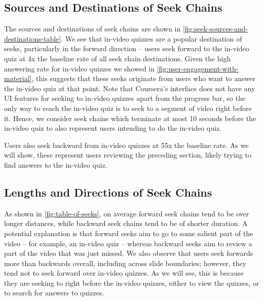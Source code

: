 \documentclass{sigchi}
\begin{document}
\subsection{Sources and Destinations of Seek Chains}

The sources and destinations of seek chains are shown in \autoref{fig:seek-sources-and-destinations-table}. We see that in-video quizzes are a popular destination of seeks, particularly in the forward direction -- users seek forward to the in-video quiz at 4x the baseline rate of all seek chain destinations. Given the high answering rate for in-video quizzes we showed in \autoref{fig:user-engagement-with-material}, this suggests that these seeks originate from users who want to answer the in-video quiz at that point. Note that Coursera's interface does not have any UI features for seeking to in-video quizzes apart from the progress bar, so the only way to reach the in-video quiz is to seek to a segment of video right before it. Hence, we consider seek chains which terminate at most 10 seconds before the in-video quiz to also represent users intending to do the in-video quiz.

Users also seek backward from in-video quizzes at 55x the baseline rate. As we will show, these represent users reviewing the preceding section, likely trying to find answers to the in-video quiz.





\subsection{Lengths and Directions of Seek Chains}

As shown in \autoref{fig:table-of-seeks}, on average forward seek chains tend to be over longer distances, while backward seek chains tend to be of shorter duration. A potential explanation is that forward seeks aim to go to some salient part of the video -- for example, an in-video quiz -- whereas backward seeks aim to review a part of the video that was just missed. We also observe that users seek forwards more than backwards overall, including across slide boundaries; however, they tend not to seek forward over in-video quizzes. As we will see, this is because they are seeking to right before the in-video quizzes, either to view the quizzes, or to search for answers to quizzes. %
\end{document}
